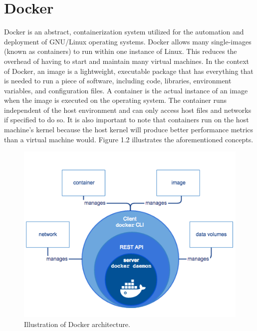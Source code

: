 
\section{Docker}

Docker is an abstract, containerization system utilized for the automation and deployment of GNU/Linux operating systems.  Docker allows many single-images (known as containers) to run within one instance of Linux. This reduces the overhead of having to start and maintain many virtual machines.
    In the context of Docker, an image is a lightweight, executable package that has everything that is needed to run a piece of software, including code, libraries, environment variables, and configuration files. A container is the actual instance of an image when the image is executed on the operating system. The container runs independent of the host environment and can only access host files and networks if specified to do so. It is also important to note that containers run on the host machine’s kernel because the host kernel will produce better performance metrics than a virtual machine would. Figure 1.2 illustrates the aforementioned concepts.

\begin{figure}
\centering
\includegraphics[scale=0.8]{Figures/docker-diagram}
\decoRule
\caption[Docker Architecture]{Illustration of Docker architecture.}
\label{fig:Docker Architecture}
\end{figure}


